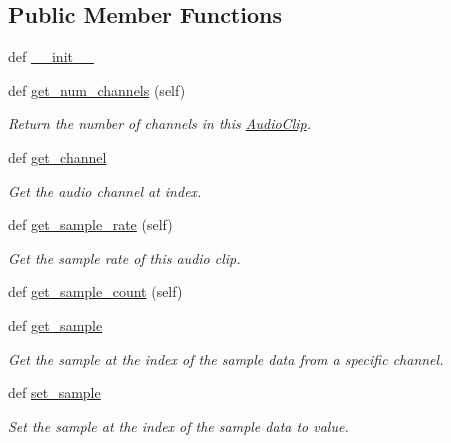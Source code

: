 \subsection*{Public Member Functions}
\begin{DoxyCompactItemize}
\item 
def \hyperlink{classbridges_1_1audio__clip_1_1_audio_clip_aa159be044564628f5c87dc1e988e2b4e}{\+\_\+\+\_\+init\+\_\+\+\_\+}
\item 
def \hyperlink{classbridges_1_1audio__clip_1_1_audio_clip_af881900e292374fabf1f53a253571e5f}{get\+\_\+num\+\_\+channels} (self)
\begin{DoxyCompactList}\small\item\em Return the number of channels in this \hyperlink{classbridges_1_1audio__clip_1_1_audio_clip}{Audio\+Clip}. \end{DoxyCompactList}\item 
def \hyperlink{classbridges_1_1audio__clip_1_1_audio_clip_a9e322508117351585d6f3d22e2ccb3bc}{get\+\_\+channel}
\begin{DoxyCompactList}\small\item\em Get the audio channel at index. \end{DoxyCompactList}\item 
def \hyperlink{classbridges_1_1audio__clip_1_1_audio_clip_a6e9cad3d81f39b3fe811307f024fa713}{get\+\_\+sample\+\_\+rate} (self)
\begin{DoxyCompactList}\small\item\em Get the sample rate of this audio clip. \end{DoxyCompactList}\item 
def \hyperlink{classbridges_1_1audio__clip_1_1_audio_clip_ace0227160e6743e8fd19c803af81d474}{get\+\_\+sample\+\_\+count} (self)
\item 
def \hyperlink{classbridges_1_1audio__clip_1_1_audio_clip_a6ebead4b2cbd7c5d39c3d67775013ac4}{get\+\_\+sample}
\begin{DoxyCompactList}\small\item\em Get the sample at the index of the sample data from a specific channel. \end{DoxyCompactList}\item 
def \hyperlink{classbridges_1_1audio__clip_1_1_audio_clip_af9b9e0b615ada4a6802121f59af3da89}{set\+\_\+sample}
\begin{DoxyCompactList}\small\item\em Set the sample at the index of the sample data to value. \end{DoxyCompactList}\item 

\end{DoxyCompactItemize}
